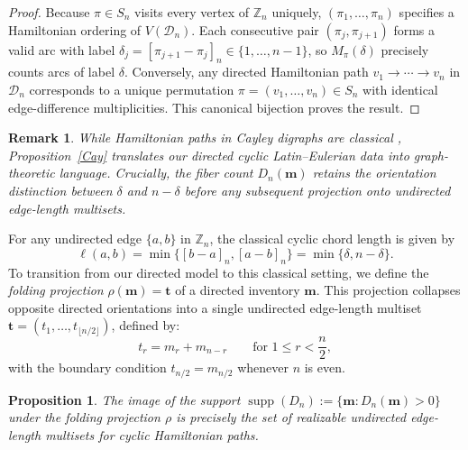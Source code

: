 \documentclass[11pt,a4paper]{amsart}
\newtheorem{proposition}[theorem]{Proposition}
\newtheorem{remark}[theorem]{Remark}
\newcommand{\supp}{\operatorname{supp}}
\newcommand{\1}{\mathbf{1}}
\begin{document}
\begin{proof}
Because $\pi \in S_n$ visits every vertex of $\mathbb{Z}_n$ uniquely, $(\pi_1, \dots, \pi_n)$ specifies a Hamiltonian ordering of $V(\mathcal{D}_n)$. Each consecutive pair $(\pi_j, \pi_{j+1})$ forms a valid arc with label $\delta_j = [\pi_{j+1} - \pi_j]_n \in \{1, \ldots, n-1\}$, so $M_\pi(\delta)$ precisely counts arcs of label $\delta$. Conversely, any directed Hamiltonian path $v_1 \longrightarrow \cdots \longrightarrow v_n$ in $\mathcal{D}_n$ corresponds to a unique permutation $\pi = (v_1, \ldots, v_n) \in S_n$ with identical edge-difference multiplicities. This canonical bijection proves the result.
\end{proof}
\begin{remark}
While Hamiltonian paths in Cayley digraphs are classical \cite{CurranGallian1996}, Proposition~\ref{Cay} translates our directed cyclic Latin--Eulerian data into graph-theoretic language. Crucially, the fiber count $D_n(\mathbf{m})$ retains the orientation distinction between $\delta$ and $n-\delta$ before any subsequent projection onto undirected edge-length multisets.
\end{remark}
For any undirected edge $\{a,b\}$ in $\mathbb{Z}_n$, the classical cyclic chord length is given by
\begin{equation}
    \ell(a,b) = \min\{[b-a]_n, [a-b]_n\} = \min\{\delta, n-\delta\}.
\end{equation}
To transition from our directed model to this classical setting, we define the \emph{folding projection} $\rho(\bm{m}) = \bm{t}$ of a directed inventory $\bm{m}$. This projection collapses opposite directed orientations into a single undirected edge-length multiset $\bm{t} = (t_1, \dots, t_{\lfloor n/2 \rfloor})$, defined by:
\begin{equation}
    t_r = m_r + m_{n-r} \qquad \text{for } 1 \le r < \frac{n}{2},
\end{equation}
with the boundary condition $t_{n/2} = m_{n/2}$ whenever $n$ is even.
\begin{proposition}\label{BHR}
The image of the support $\supp(D_n) := \{\bm{m} : D_n(\bm{m}) > 0\}$ under the folding projection $\rho$ is precisely the set of realizable undirected edge-length multisets for cyclic Hamiltonian paths.
\end{proposition}
\end{document}
